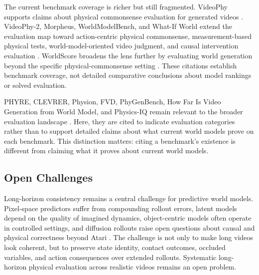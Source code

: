 The current benchmark coverage is richer but still fragmented. VideoPhy supports claims about physical commonsense evaluation for generated videos \cite{bansal2025_videophy_prov}. VideoPhy-2, Morpheus, WorldModelBench, and What-If World extend the evaluation map toward action-centric physical commonsense, measurement-based physical tests, world-model-oriented video judgment, and causal intervention evaluation \cite{bansal2025videophy2_prov,zhang2025morpheus_prov,li2025worldmodelbench_prov,cai2026whatifworld_prov}. WorldScore broadens the lens further by evaluating world generation beyond the specific physical-commonsense setting \cite{duan2025worldscore}. These citations establish benchmark coverage, not detailed comparative conclusions about model rankings or solved evaluation.

PHYRE, CLEVRER, Physion, FVD, PhyGenBench, How Far Is Video Generation from World Model, and Physics-IQ remain relevant to the broader evaluation landscape \cite{bakhtin2019_phyre_prov,yi2020_clevrer_prov,bear2021_physion_prov,unterthiner2018_fvd_prov,meng2025_phygenbench_prov,kang2025_physical_law_perspective_prov,motamed2025_physics_iq_prov}. Here, they are cited to indicate evaluation categories rather than to support detailed claims about what current world models prove on each benchmark. This distinction matters: citing a benchmark's existence is different from claiming what it proves about current world models.

\subsection{Open Challenges}

Long-horizon consistency remains a central challenge for predictive world models. Pixel-space predictors suffer from compounding rollout errors, latent models depend on the quality of imagined dynamics, object-centric models often operate in controlled settings, and diffusion rollouts raise open questions about causal and physical correctness beyond Atari \cite{oh2015_action_conditional_video_prediction_prov,hafner2020_dreamer_prov,watters2017_visual_interaction_networks_prov,alonso2024_diamond_prov}. The challenge is not only to make long videos look coherent, but to preserve state identity, contact outcomes, occluded variables, and action consequences over extended rollouts. Systematic long-horizon physical evaluation across realistic videos remains an open problem.

